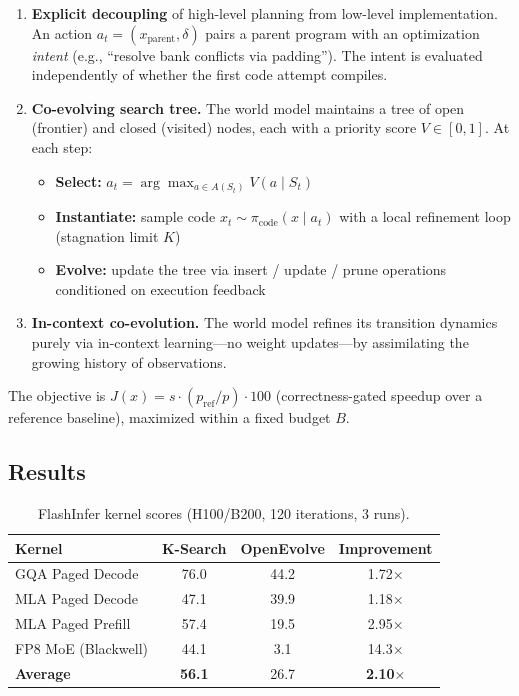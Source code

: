 \documentclass[11pt]{article}
\begin{document}
\begin{enumerate}
    \item \textbf{Explicit decoupling} of high-level planning from low-level implementation. An action $a_t = (x_{\text{parent}}, \delta)$ pairs a parent program with an optimization \emph{intent} (e.g., ``resolve bank conflicts via padding''). The intent is evaluated independently of whether the first code attempt compiles.

    \item \textbf{Co-evolving search tree.} The world model maintains a tree of open (frontier) and closed (visited) nodes, each with a priority score $V \in [0,1]$. At each step:
    \begin{itemize}
        \item \textbf{Select:} $a_t = \arg\max_{a \in A(S_t)} V(a \mid S_t)$
        \item \textbf{Instantiate:} sample code $x_t \sim \pi_{\text{code}}(x \mid a_t)$ with a local refinement loop (stagnation limit $K$)
        \item \textbf{Evolve:} update the tree via insert / update / prune operations conditioned on execution feedback
    \end{itemize}

    \item \textbf{In-context co-evolution.} The world model refines its transition dynamics purely via in-context learning---no weight updates---by assimilating the growing history of observations.
\end{enumerate}

The objective is $J(x) = s \cdot (p_{\text{ref}} / p) \cdot 100$ (correctness-gated speedup over a reference baseline), maximized within a fixed budget $B$.

\subsection{Results}

\begin{table}[h]
\centering
\small
\begin{tabular}{lccc}
\toprule
\textbf{Kernel} & \textbf{K-Search} & \textbf{OpenEvolve} & \textbf{Improvement} \\
\midrule
GQA Paged Decode & 76.0 & 44.2 & 1.72$\times$ \\
MLA Paged Decode & 47.1 & 39.9 & 1.18$\times$ \\
MLA Paged Prefill & 57.4 & 19.5 & 2.95$\times$ \\
FP8 MoE (Blackwell) & 44.1 & 3.1 & 14.3$\times$ \\
\midrule
\textbf{Average} & \textbf{56.1} & 26.7 & \textbf{2.10$\times$} \\
\bottomrule
\end{tabular}
\caption{FlashInfer kernel scores (H100/B200, 120 iterations, 3 runs).}
\end{table}
\end{document}
